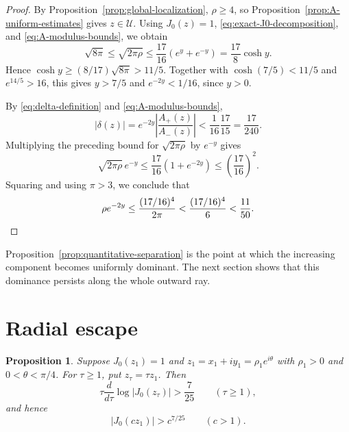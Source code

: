 \documentclass[11pt]{amsart}
\numberwithin{equation}{section}
\newtheorem{proposition}[theorem]{Proposition}
\theoremstyle{definition}
\theoremstyle{remark}
\begin{document}
\begin{proof}
By Proposition~\ref{prop:global-localization}, $\rho\ge4$, so
Proposition~\ref{prop:A-uniform-estimates} gives $z\in\mathcal U$.
Using $J_0(z)=1$, \eqref{eq:exact-J0-decomposition}, and
\eqref{eq:A-modulus-bounds}, we obtain
\[
   \sqrt{8\pi}\le\sqrt{2\pi\rho}
   \le\frac{17}{16}(e^y+e^{-y})=\frac{17}{8}\cosh y.
\]
Hence $\cosh y\ge(8/17)\sqrt{8\pi}>11/5$.  Together with
$\cosh(7/5)<11/5$ and $e^{14/5}>16$, this gives $y>7/5$ and
$e^{-2y}<1/16$, since $y>0$.

By \eqref{eq:delta-definition} and \eqref{eq:A-modulus-bounds},
\[
   |\delta(z)|
   =e^{-2y}\left|\frac{A_+(z)}{A_-(z)}\right|
   <\frac1{16}\frac{17}{15}=\frac{17}{240}.
\]
Multiplying the preceding bound for $\sqrt{2\pi\rho}$ by $e^{-y}$ gives
\[
   \sqrt{2\pi\rho}\,e^{-y}
   \le\frac{17}{16}(1+e^{-2y})
   \le\left(\frac{17}{16}\right)^2.
\]
Squaring and using $\pi>3$, we conclude that
\[
   \rho e^{-2y}
   \le\frac{(17/16)^4}{2\pi}
   <\frac{(17/16)^4}{6}
   <\frac{11}{50}.\qedhere
\]
\end{proof}

Proposition~\ref{prop:quantitative-separation} is the point at which the
increasing component becomes uniformly dominant.  The next section shows
that this dominance persists along the whole outward ray.

\section{Radial escape}\label{sec:escape}

\begin{proposition}
\label{prop:principal-radial-escape}
Suppose $J_0(z_1)=1$ and
$z_1=x_1+iy_1=\rho_1e^{i\theta}$ with $\rho_1>0$ and
$0<\theta<\pi/4$.  For
$\tau\ge1$, put $z_\tau=\tau z_1$.  Then
\begin{equation}\label{eq:radial-log-derivative}
   \tau\frac{d}{d\tau}\log|J_0(z_\tau)|>\frac7{25}
   \qquad(\tau\ge1),
\end{equation}
and hence
\begin{equation}\label{eq:principal-radial-escape}
   |J_0(cz_1)|>c^{7/25}\qquad(c>1).
\end{equation}
\end{proposition}
\end{document}
